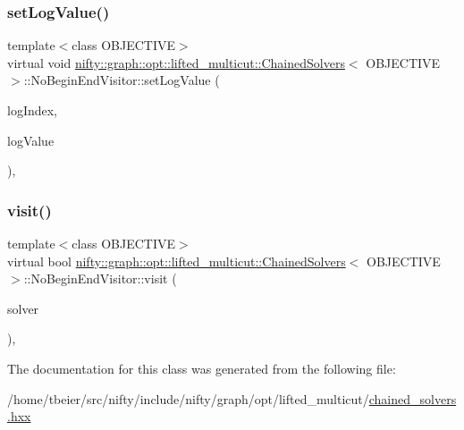 \subsubsection{\texorpdfstring{set\+Log\+Value()}{setLogValue()}}
{\footnotesize\ttfamily template$<$class O\+B\+J\+E\+C\+T\+I\+VE$>$ \\
virtual void \hyperlink{classnifty_1_1graph_1_1opt_1_1lifted__multicut_1_1ChainedSolvers}{nifty\+::graph\+::opt\+::lifted\+\_\+multicut\+::\+Chained\+Solvers}$<$ O\+B\+J\+E\+C\+T\+I\+VE $>$\+::No\+Begin\+End\+Visitor\+::set\+Log\+Value (\begin{DoxyParamCaption}\item[{const size\+\_\+t}]{log\+Index,  }\item[{double}]{log\+Value }\end{DoxyParamCaption})\hspace{0.3cm}{\ttfamily [inline]}, {\ttfamily [virtual]}}

\mbox{\label{classnifty_1_1graph_1_1opt_1_1lifted__multicut_1_1ChainedSolvers_1_1NoBeginEndVisitor_a4d9925d9386eaf87359b0d5c5e166907}} 
\subsubsection{\texorpdfstring{visit()}{visit()}}
{\footnotesize\ttfamily template$<$class O\+B\+J\+E\+C\+T\+I\+VE$>$ \\
virtual bool \hyperlink{classnifty_1_1graph_1_1opt_1_1lifted__multicut_1_1ChainedSolvers}{nifty\+::graph\+::opt\+::lifted\+\_\+multicut\+::\+Chained\+Solvers}$<$ O\+B\+J\+E\+C\+T\+I\+VE $>$\+::No\+Begin\+End\+Visitor\+::visit (\begin{DoxyParamCaption}\item[{\hyperlink{classnifty_1_1graph_1_1opt_1_1lifted__multicut_1_1ChainedSolvers_a8d7bda129d1f1afb9dca81ff513dca09}{Base\+Type} $\ast$}]{solver }\end{DoxyParamCaption})\hspace{0.3cm}{\ttfamily [inline]}, {\ttfamily [virtual]}}



The documentation for this class was generated from the following file\+:\begin{DoxyCompactItemize}
\item 
/home/tbeier/src/nifty/include/nifty/graph/opt/lifted\+\_\+multicut/\hyperlink{lifted__multicut_2chained__solvers_8hxx}{chained\+\_\+solvers.\+hxx}\end{DoxyCompactItemize}
